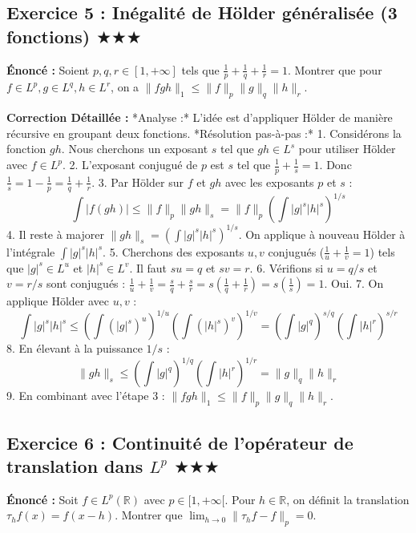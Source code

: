 \documentclass[11pt,a4paper]{article}
\begin{document}
\subsection*{Exercice 5 : Inégalité de Hölder généralisée (3 fonctions) $\bigstar\bigstar\bigstar$}

\textbf{Énoncé :} Soient $p, q, r \in [1, +\infty]$ tels que $\frac{1}{p} + \frac{1}{q} + \frac{1}{r} = 1$. Montrer que pour $f \in L^p, g \in L^q, h \in L^r$, on a $\|fgh\|_1 \le \|f\|_p \|g\|_q \|h\|_r$.

\textbf{Correction Détaillée :}
*Analyse :* L'idée est d'appliquer Hölder de manière récursive en groupant deux fonctions.
*Résolution pas-à-pas :*
1. Considérons la fonction $gh$. Nous cherchons un exposant $s$ tel que $gh \in L^s$ pour utiliser Hölder avec $f \in L^p$.
2. L'exposant conjugué de $p$ est $s$ tel que $\frac{1}{p} + \frac{1}{s} = 1$. Donc $\frac{1}{s} = 1 - \frac{1}{p} = \frac{1}{q} + \frac{1}{r}$.
3. Par Hölder sur $f$ et $gh$ avec les exposants $p$ et $s$ :
   $$\int |f(gh)| \le \|f\|_p \|gh\|_s = \|f\|_p \left( \int |g|^s |h|^s \right)^{1/s}$$
4. Il reste à majorer $\|gh\|_s = (\int |g|^s |h|^s)^{1/s}$. On applique à nouveau Hölder à l'intégrale $\int |g|^s |h|^s$.
5. Cherchons des exposants $u, v$ conjugués ($\frac{1}{u} + \frac{1}{v} = 1$) tels que $|g|^s \in L^u$ et $|h|^s \in L^v$. Il faut $su = q$ et $sv = r$.
6. Vérifions si $u = q/s$ et $v = r/s$ sont conjugués : $\frac{1}{u} + \frac{1}{v} = \frac{s}{q} + \frac{s}{r} = s(\frac{1}{q} + \frac{1}{r}) = s(\frac{1}{s}) = 1$. Oui.
7. On applique Hölder avec $u, v$ :
   $$\int |g|^s |h|^s \le \left(\int (|g|^s)^u\right)^{1/u} \left(\int (|h|^s)^v\right)^{1/v} = \left(\int |g|^q\right)^{s/q} \left(\int |h|^r\right)^{s/r}$$
8. En élevant à la puissance $1/s$ :
   $$\|gh\|_s \le \left( \int |g|^q \right)^{1/q} \left( \int |h|^r \right)^{1/r} = \|g\|_q \|h\|_r$$
9. En combinant avec l'étape 3 : $\|fgh\|_1 \le \|f\|_p \|g\|_q \|h\|_r$.


\subsection*{Exercice 6 : Continuité de l'opérateur de translation dans $L^p$ $\bigstar\bigstar\bigstar$}

\textbf{Énoncé :} Soit $f \in L^p(\mathbb{R})$ avec $p \in [1, +\infty[$. Pour $h \in \mathbb{R}$, on définit la translation $\tau_h f(x) = f(x-h)$. Montrer que $\lim_{h \to 0} \|\tau_h f - f\|_p = 0$.
\end{document}
